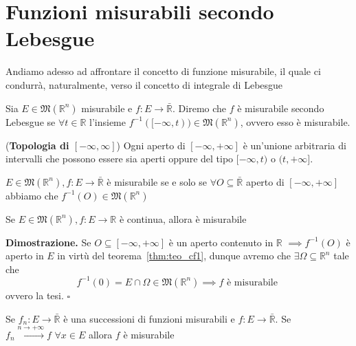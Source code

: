 \section{Funzioni misurabili secondo Lebesgue}
Andiamo adesso ad affrontare il concetto di funzione misurabile, il quale ci condurrà, naturalmente, verso il concetto di integrale di Lebesgue
%
\vspace{0.5cm}
\begin{definition}[\textcolor{blue}{funzioni misurabili secondo Lebesgue}]
Sia $E \in \mathfrak{M}(\mathbb{R}^n)$ misurabile e $f: E \to \bar{\mathbb{R}}$. Diremo che $f$ è misurabile secondo Lebesgue se $\forall t \in \mathbb{R}$ l'insieme $f^{-1}([-\infty, t)) \in \mathfrak{M}(\mathbb{R}^n)$, ovvero esso è misurabile.
\end{definition}
%
\begin{remark}(\textbf{Topologia di $[-\infty, \infty]$})
	Ogni aperto di $[-\infty, +\infty]$ è un'unione arbitraria di intervalli che possono essere sia aperti oppure del tipo $[-\infty, t)$ o $(t, +\infty]$.
\end{remark}
%
\vspace{0.5cm}
\begin{prop}[\textcolor{blue}{caratterizzazione delle funzioni misurabili}]
	$E \in \mathfrak{M}(\mathbb{R}^n), f: E \to \bar{\mathbb{R}}$ è misurabile se e solo se $\forall O \subseteq \bar{\mathbb{R}}$ aperto di $[-\infty, +\infty]$ abbiamo che $f^{-1}(O) \in \mathfrak{M}(\mathbb{R}^n)$
\end{prop}
%
\vspace{0.5cm}
\begin{prop}[\textcolor{blue}{le funzioni continue sono misurabili}]
	Se $E \in \mathfrak{M}(\mathbb{R}^n), f: E \to \mathbb{R}$ è continua, allora è misurabile
\end{prop}
%
\noindent \textbf{Dimostrazione. }
	Se $O \subseteq [-\infty, +\infty]$ è un aperto contenuto in $\mathbb{R}$ $\implies f^{-1}(O)$ è aperto in $E$ in virtù del teorema~\ref{thm:teo_cf1}, dunque avremo che $\exists \Omega \subseteq \mathbb{R}^n$ tale che
	$$
	f^{-1}(0) = E \cap \Omega \in \mathfrak{M}(\mathbb{R}^n) \implies f \text{ è misurabile }
	$$
	ovvero la tesi.
\hfill $\square$
%
\vspace{0.5cm}
\begin{prop}
	Se $f_n: E \to \bar{\mathbb{R}}$ è una successioni di funzioni misurabili e $f:E \to \bar{\mathbb{R}}$. Se $f_n \stackrel{n \to +\infty}{\to} f \, \, \forall x \in E$ allora $f$ è misurabile
\end{prop}
